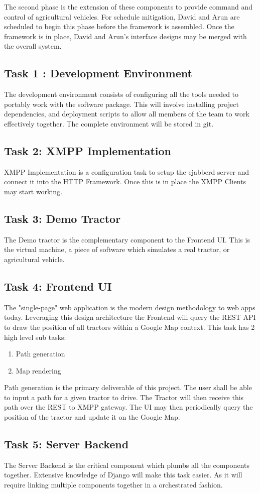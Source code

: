 \documentclass[conference,12pt]{IEEEtran}
\begin{document}
The second phase is the extension of these components to provide command and
control of agricultural vehicles. For schedule mitigation, David and Arun are
scheduled to begin this phase before the framework is assembled. Once the
framework is in place, David and Arun's interface designs may be merged with the
overall system. 
\subsection{Task 1 : Development Environment}
The development environment consists of configuring all the tools needed to
portably work with the software package. This will involve installing project
dependencies, and deployment scripts to allow all members of the team to work
effectively together. The complete environment will be stored in git.
\subsection{Task 2: XMPP Implementation}
XMPP Implementation is a configuration task to setup the ejabberd
server and connect it into the HTTP Framework. Once this is in place the XMPP
Clients may start working.
\subsection{Task 3: Demo Tractor}
The Demo tractor is the complementary component to the Frontend UI. This is the
virtual machine, a piece of software which simulates a real tractor, or
agricultural vehicle. 
\subsection{Task 4: Frontend UI}
The "single-page" web application is the modern design methodology to web apps
today. Leveraging this design architecture the Frontend will query the REST API
to draw the position of all tractors within a Google Map context. This task has
2 high level sub tasks:
\begin{enumerate}
\item Path generation
\item Map rendering
\end{enumerate}
Path generation is the primary deliverable of this project. The user shall be
able to input a path for a given tractor to drive. The Tractor will then receive
this path over the REST to XMPP gateway.  The UI may then periodically query the
position of the tractor and update it on the Google Map.
\subsection{Task 5: Server Backend}
The Server Backend is the critical component which plumbs all the components
together. Extensive knowledge of Django will make this task easier. As it will
require linking multiple components together in a orchestrated fashion.
\end{document}
